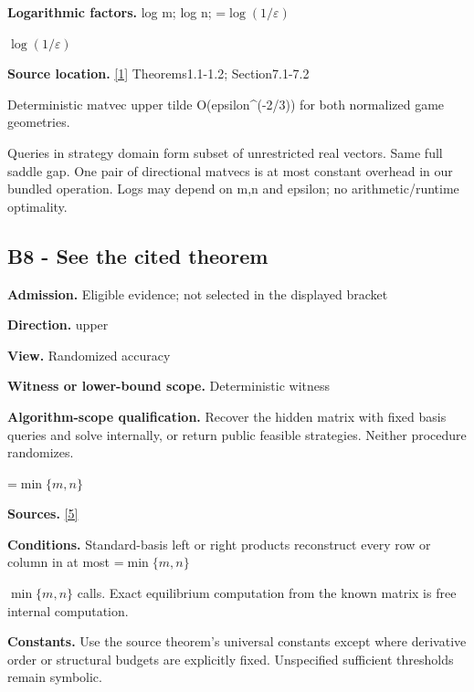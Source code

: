 \documentclass[10pt,a4paper]{article}
\newcommand{\AtlasMath}[1]{\par\begingroup\centering\setbox0=\hbox{$\displaystyle #1$}\ifdim\wd0>1.4\linewidth\typeout{ATLAS WIDE FORMULA: \the\wd0}\fi\ifdim\wd0>\linewidth\resizebox{\linewidth}{!}{\box0}\else\box0\fi\par\endgroup}
\newcommand{\AtlasInlineMath}[1]{\begingroup\setbox0=\hbox{$#1$}\ifdim\wd0>.4\linewidth\endgroup\AtlasMath{#1}\else\endgroup$#1$\fi}
\begin{document}
\textbf{Logarithmic factors.} log m; log n; \AtlasInlineMath{\log(1/\varepsilon)}



\textbf{Source location.} \href{https://arxiv.org/pdf/2601.02347v3}{[1]} Theorems1.1-1.2; Section7.1-7.2



Deterministic matvec upper tilde O(epsilon\textasciicircum{}(-2/3)) for both normalized game geometries.



Queries in strategy domain form subset of unrestricted real vectors. Same full saddle gap. One pair of directional matvecs is at most constant overhead in our bundled operation. Logs may depend on m,n and epsilon; no arithmetic/runtime optimality.



\subsection{B8 - See the cited theorem}


\textbf{Admission.} Eligible evidence; not selected in the displayed bracket



\textbf{Direction.} upper



\textbf{View.} Randomized accuracy



\textbf{Witness or lower-bound scope.} Deterministic witness



\textbf{Algorithm-scope qualification.} Recover the hidden matrix with fixed basis queries and solve internally, or return public feasible strategies. Neither procedure randomizes.



\AtlasMath{\min\{m,n\}}


\textbf{Sources.} \href{https://arxiv.org/pdf/2610.02095v2}{[5]}



\textbf{Conditions.} Standard-basis left or right products reconstruct every row or column in at most \AtlasInlineMath{\min\{m,n\}} calls. Exact equilibrium computation from the known matrix is free internal computation.



\textbf{Constants.} Use the source theorem’s universal constants except where derivative order or structural budgets are explicitly fixed. Unspecified sufficient thresholds remain symbolic.
\end{document}
